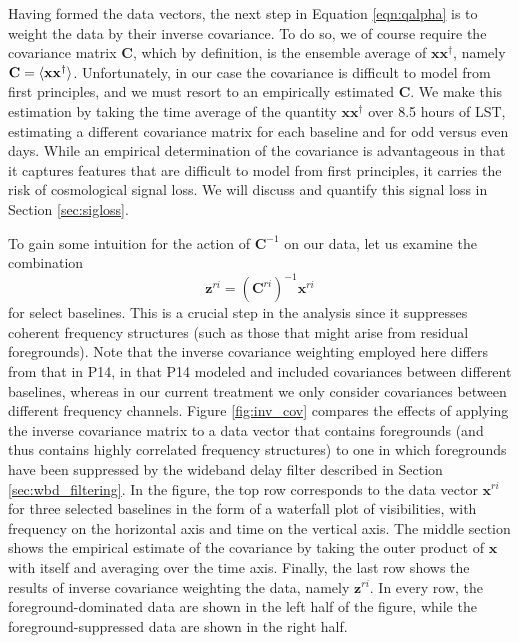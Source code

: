 \documentclass[twocolumn,numberedappendix]{emulateapj} \shorttitle{New Limits on the 21 cm Power Spectrum at $z=8.4$}
\newcommand{\x}{\mathbf{x}} \newcommand{\xhat}{\hat{\mathbf{x}}}
\begin{document}
Having formed the data vectors, the next step in Equation \eqref{eqn:qalpha} is to
weight the data by their inverse covariance. To do so, we of course require the covariance
matrix $\mathbf{C}$, which by definition, is the ensemble average of
$\x\x^\dagger$, namely $\mathbf{C} = \expval{\x\x^\dagger}$. Unfortunately, in our case the
covariance is difficult to model from first principles, and we must resort to an
empirically estimated $\mathbf{C}$. We make this estimation by taking the time average
of the quantity $\x\x^\dagger$ over 8.5 hours of LST, estimating a different covariance matrix
for each baseline and for odd versus even days. While an empirical determination of the covariance is advantageous
in that it captures features that are difficult to model from first principles, it
carries the risk of cosmological signal loss. We will discuss and quantify this signal loss
in Section \ref{sec:sigloss}.

To gain some intuition for the action of $\mathbf{C}^{-1}$ on our data, let us examine the
combination
\begin{equation}\label{eqn:z}
    \mathbf{z}^{ri} =  (\mathbf{C}^{ri})^{-1}\mathbf{x}^{ri}
\end{equation}
for select baselines. This is a crucial
step in the analysis since it suppresses coherent frequency structures (such as those
that might arise from residual foregrounds). Note that the inverse covariance weighting employed
here differs from that in P14, in that P14 modeled and included covariances between
different baselines, whereas in our current treatment we only consider covariances between
different frequency channels. 
Figure \ref{fig:inv_cov} compares the effects of applying
the inverse covariance matrix to a data vector that contains foregrounds (and thus contains
highly correlated frequency structures) to one in which foregrounds have been suppressed
by the wideband
delay filter described in Section \ref{sec:wbd_filtering}. In the figure, the
top row corresponds to the data vector $\mathbf{x}^{ri}$ for three selected baselines in the form
of a waterfall plot of
visibilities, with frequency on the horizontal axis and time on the vertical axis. The
middle section shows the empirical estimate of the covariance by taking the
outer product of $\x$ with itself and averaging over the time axis. Finally,
the last row shows the results of inverse covariance weighting the data,
namely $\mathbf{z}^{ri}$. In every row, the foreground-dominated data are shown
in the left half of the figure, while the foreground-suppressed data are shown in the right half.
\end{document}
